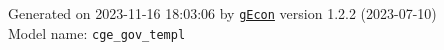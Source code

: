 \documentclass[10pt,a4paper]{article}
\numberwithin{equation}{section}
\begin{document}
\begin{landscape}
\begin{flushleft}{\large
Generated  on 2023-11-16 18:03:06 by \href{http://gecon.r-forge.r-project.org/}{\texttt{gEcon}} version 1.2.2 (2023-07-10)\\
Model name: \verb+cge_gov_templ+
}\end{flushleft}


\end{landscape}

\end{document}
